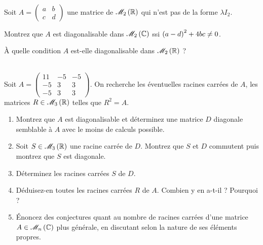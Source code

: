 \begin{exos}[Exercice 13]~\\
Soit \(A=\begin{pmatrix}
a & b \\
c & d
\end{pmatrix}\) une matrice de \(\M{2}[\R]\) qui n'est pas de la forme \(\lambda I_2\).

Montrez que \(A\) est diagonalisable dans \(\M{2}[\C]\) ssi \(\left(a-d\right)^2+4bc\not=0\).

À quelle condition \(A\) est-elle diagonalisable dans \(\M{2}[\R]\) ?
\end{exos}



\begin{exoss}[Exercice 14]~\\
Soit \(A=\begin{pmatrix}
11 & -5 & -5 \\
-5 & 3 & 3 \\
-5 & 3 & 3
\end{pmatrix}\). On recherche les éventuelles racines carrées de \(A\), \cad les matrices \(R\in\M{3}[\R]\) telles que \(R^2=A\).

\begin{enumerate}
    \item Montrez que \(A\) est diagonalisable et déterminez une matrice \(D\) diagonale semblable à \(A\) avec le moins de calculs possible. \\
    \item Soit \(S\in\M{3}[\R]\) une racine carrée de \(D\). Montrez que \(S\) et \(D\) commutent puis montrez que \(S\) est diagonale. \\
    \item Déterminez les racines carrées \(S\) de \(D\). \\
    \item Déduisez-en toutes les racines carrées \(R\) de \(A\). Combien y en a-t-il ? Pourquoi ? \\
    \item Énoncez des conjectures quant au nombre de racines carrées d'une matrice \(A\in\M{n}[\C]\) plus générale, en discutant selon la nature de ses éléments propres.
\end{enumerate}
\end{exoss}



